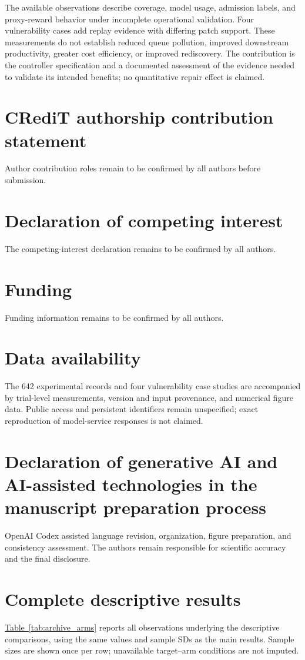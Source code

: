 \documentclass[final,5p,times,number]{elsarticle}
\newcommand{\namedref}[2]{\hyperref[#2]{#1~\ref*{#2}}}
\begin{document}
The available observations describe coverage, model usage, admission labels, and proxy-reward behavior under incomplete operational validation. Four vulnerability cases add replay evidence with differing patch support. These measurements do not establish reduced queue pollution, improved downstream productivity, greater cost efficiency, or improved rediscovery. The contribution is the controller specification and a documented assessment of the evidence needed to validate its intended benefits; no quantitative repair effect is claimed.

\section*{CRediT authorship contribution statement}
Author contribution roles remain to be confirmed by all authors before submission.
\section*{Declaration of competing interest}
The competing-interest declaration remains to be confirmed by all authors.
\section*{Funding}
Funding information remains to be confirmed by all authors.
\section*{Data availability}
The 642 experimental records and four vulnerability case studies are accompanied by trial-level measurements, version and input provenance, and numerical figure data. Public access and persistent identifiers remain unspecified; exact reproduction of model-service responses is not claimed.
\section*{Declaration of generative AI and AI-assisted technologies in the manuscript preparation process}
OpenAI Codex assisted language revision, organization, figure preparation, and consistency assessment. The authors remain responsible for scientific accuracy and the final disclosure.

\appendix
\setcounter{table}{0}
\renewcommand{\theHtable}{appendix.\Alph{section}.\arabic{table}}
\section{Complete descriptive results}
\label{sec:archive_appendix}
\namedref{Table}{tab:archive_arms} reports all observations underlying the descriptive comparisons, using the same values and sample SDs as the main results. Sample sizes are shown once per row; unavailable target--arm conditions are not imputed.




\end{document}
